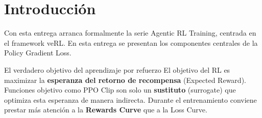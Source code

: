 \section{Introducción}
Con esta entrega arranca formalmente la serie Agentic RL Training, centrada en el framework veRL. En esta entrega se presentan los componentes centrales de la Policy Gradient Loss.

\begin{importantbox}{El verdadero objetivo del aprendizaje por refuerzo}
El objetivo del RL es maximizar la \textbf{esperanza del retorno de recompensa} (Expected Reward). Funciones objetivo como PPO Clip son solo un \textbf{sustituto} (surrogate) que optimiza esta esperanza de manera indirecta. Durante el entrenamiento conviene prestar más atención a la \textbf{Rewards Curve} que a la Loss Curve.
\end{importantbox}

